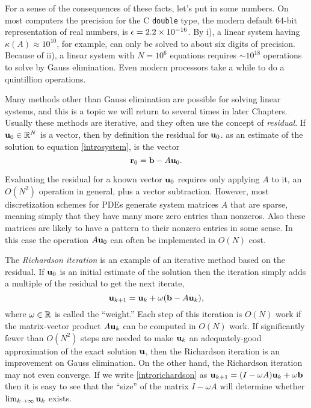 For a sense of the consequences of these facts, let's put in some numbers.  On most computers the precision for the C \texttt{double} type, the modern default 64-bit representation of real numbers, is $\epsilon = 2.2 \times 10^{-16}$.  By i), a linear system having $\kappa(A) \approx 10^{10}$, for example, can only be solved to about six digits of precision.  Because of ii), a linear system with $N=10^6$ equations
requires $\sim 10^{18}$ operations to solve by Gauss elimination.  Even modern processors take a while to do a quintillion operations.

Many methods other than Gauss elimination are possible for solving linear systems, and this is a topic we will return to several times in later Chapters.  Usually these methods are iterative, and they often use the concept of \emph{residual}.  If $\mathbf{u}_0\in \mathbb{R}^N$ is a vector, then by definition the residual for $\mathbf{u}_0$. as an estimate of the solution to equation \eqref{introsystem}, is the vector
\begin{equation}
\mathbf{r}_0 = \mathbf{b} - A \mathbf{u}_0. \label{residualdefn}
\end{equation}

Evaluating the residual for a known vector $\mathbf{u}_0$ requires only applying $A$ to it, an $O(N^2)$ operation in general, plus a vector subtraction.  However, most discretization schemes for PDEs generate system matrices $A$ that are sparse, meaning simply that they have many more zero entries than nonzeros.  Also these matrices are likely to have a pattern to their nonzero entries in some sense.  In this case the operation $A\mathbf{u}_0$ can often be implemented in $O(N)$ cost.

The \emph{Richardson iteration} is an example of an iterative method based on the residual.  If $\mathbf{u}_0$ is an initial estimate of the solution then the iteration simply adds a multiple of the residual to get the next iterate,
\begin{equation}
\mathbf{u}_{k+1} = \mathbf{u}_k + \omega (\mathbf{b} - A \mathbf{u}_k),  \label{introrichardson}
\end{equation}
where $\omega\in\mathbb{R}$ is called the ``weight.''  Each step of this iteration is $O(N)$ work if the matrix-vector product $A\mathbf{u}_k$ can be computed in $O(N)$ work.  If significantly fewer than $O(N^2)$ steps are needed to make $\mathbf{u}_k$ an adequately-good approximation of the exact solution $\mathbf{u}$, then the Richardson iteration is an improvement on Gauss elimination.  On the other hand, the Richardson iteration may not even converge.  If we write \eqref{introrichardson} as $\mathbf{u}_{k+1} = (I - \omega A) \mathbf{u}_k + \omega \mathbf{b}$ then it is easy to see that the ``size'' of the matrix $I-\omega A$ will determine whether $\lim_{k\to\infty} \mathbf{u}_k$ exists.

